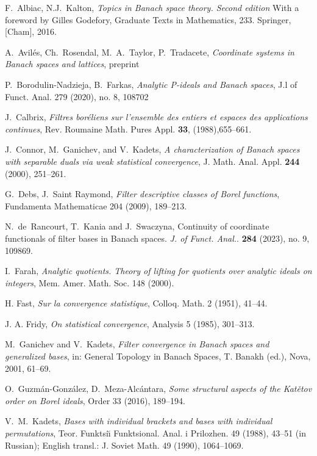 \documentclass{amsart}
\begin{document}

%
\begin{thebibliography}{}

 F.~Albiac, N.J.~Kalton, \emph{Topics in {B}anach space theory. Second edition} With a foreword by Gilles Godefory, Graduate Texts in Mathematics, 233. Springer, [Cham], 2016. 

 A.~Avilés, Ch.~Rosendal, M.~A.~Taylor, P.~Tradacete, \emph{Coordinate systems in Banach spaces and lattices}, preprint

 P.~Borodulin-Nadzieja, B.~Farkas, \emph{Analytic P-ideals and Banach spaces}, J.l of Funct. Anal. 279 (2020), no. 8, 108702

 J.~Calbrix, \emph{Filtres bor\'{e}liens sur l'ensemble des entiers et espaces des applications continues}, Rev. Roumaine Math. Pures Appl. \textbf{33}, (1988),655--661.

 J.~Connor, M.~Ganichev, and V.~Kadets, \emph{A characterization of Banach spaces with separable duals via weak statistical convergence}, J. Math. Anal. Appl. \textbf{244} (2000), 251--261.

 G.~Debs, J.~Saint Raymond, \emph{Filter descriptive classes of Borel functions}, Fundamenta Mathematicae 204 (2009), 189--213. 

 N.~de~Rancourt, T.~Kania and J.~Swaczyna, Continuity of coordinate functionals of filter bases in Banach spaces. \emph{J. of Funct. Anal.}. \textbf{284} (2023), no. 9, 109869.

I.~Farah, \emph{Analytic quotients. Theory of lifting for quotients over analytic ideals on integers}, 
Mem. Amer. Math. Soc. 148 (2000).

H. Fast, \emph{Sur la convergence statistique}, Colloq. Math. 2 (1951), 41--44.

J. A. Fridy, \emph{On statistical convergence}, Analysis 5 (1985), 301--313.

 M.~Ganichev and V.~Kadets, \emph{Filter convergence in Banach spaces and generalized bases}, in: General Topology in Banach Spaces, T. Banakh (ed.), Nova, 2001, 61--69.

 O.~Guzmán-González, D.~Meza-Alcántara, \emph{Some structural aspects of the Kat\v{e}tov order on Borel ideals}, Order 33 (2016), 189--194.

 V.~M.~Kadets, \emph{Bases with individual brackets and bases with individual permutations}, Teor. Funktsi\u{\i} Funktsional. Anal. i Prilozhen. 49 (1988), 43--51 (in Russian); English
transl.: J. Soviet Math. 49 (1990), 1064--1069.


\end{thebibliography}
\end{document}
